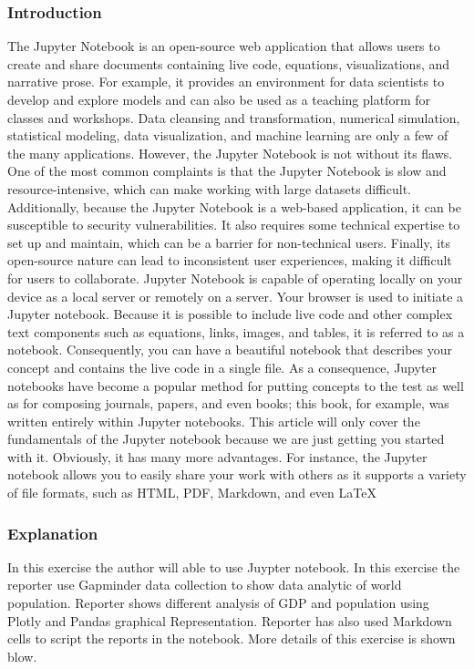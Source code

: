 \documentclass[12pt, A4]{report}
\begin{document}
\subsubsection{Introduction}
The Jupyter Notebook is an open-source web application that allows users to create and share documents containing live code, equations, visualizations, and narrative prose. For example, it provides an environment for data scientists to develop and explore models and can also be used as a teaching platform for classes and workshops. Data cleansing and transformation, numerical simulation, statistical modeling, data visualization, and machine learning are only a few of the many applications. However, the Jupyter Notebook is not without its flaws. One of the most common complaints is that the Jupyter Notebook is slow and resource-intensive, which can make working with large datasets difficult. Additionally, because the Jupyter Notebook is a web-based application, it can be susceptible to security vulnerabilities. It also requires some technical expertise to set up and maintain, which can be a barrier for non-technical users. Finally, its open-source nature can lead to inconsistent user experiences, making it difficult for users to collaborate. Jupyter Notebook is capable of operating locally on your device as a local server or remotely on a server. Your browser is used to initiate a Jupyter notebook. Because it is possible to include live code and other complex text components such as equations, links, images, and tables, it is referred to as a notebook. Consequently, you can have a beautiful notebook that describes your concept and contains the live code in a single file. As a consequence, Jupyter notebooks have become a popular method for putting concepts to the test as well as for composing journals, papers, and even books; this book, for example, was written entirely within Jupyter notebooks. This article will only cover the fundamentals of the Jupyter notebook because we are just getting you started with it. Obviously, it has many more advantages. For instance, the Jupyter notebook allows you to easily share your work with others as it supports a variety of file formats, such as HTML, PDF, Markdown, and even LaTeX
\subsubsection{Explanation}
In this exercise the author will able to use Juypter notebook. In this exercise the reporter use Gapminder data collection to show data analytic of world population. Reporter shows different analysis of GDP and population using Plotly and Pandas graphical Representation. Reporter has also used Markdown cells to script the reports in the notebook. More details of this exercise is shown blow.
\end{document}
